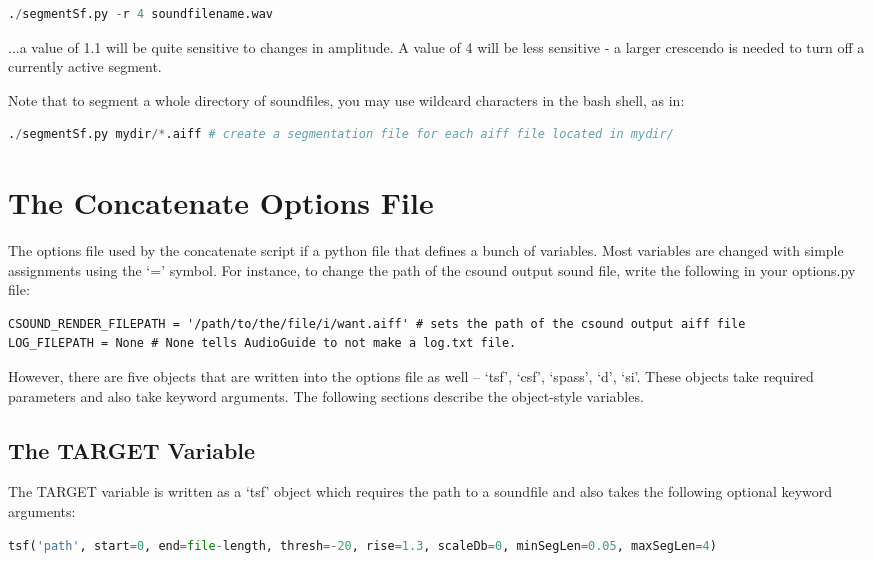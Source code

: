 \documentclass{article}
\begin{document}
\begin{spacing}{1.2}
\begin{lstlisting}[language=python]
./segmentSf.py -r 4 soundfilename.wav
\end{lstlisting}

...a value of 1.1 will be quite sensitive to changes in amplitude.  A value of 4 will be less sensitive - a larger crescendo is needed to turn off a currently active segment.

Note that to segment a whole directory of soundfiles, you may use wildcard characters in the bash shell, as in:
\begin{lstlisting}[language=python]
./segmentSf.py mydir/*.aiff # create a segmentation file for each aiff file located in mydir/
\end{lstlisting}


\section{The Concatenate Options File}
The options file used by the concatenate script if a python file that defines a bunch of variables.  Most variables are changed with simple assignments using the `=' symbol.  For instance, to change the path of the csound output sound file, write the following in your options.py file:
\begin{lstlisting}
CSOUND_RENDER_FILEPATH = '/path/to/the/file/i/want.aiff' # sets the path of the csound output aiff file
LOG_FILEPATH = None # None tells AudioGuide to not make a log.txt file.
\end{lstlisting}


However, there are five objects that are written into the options file as well -- `tsf', `csf', `spass', `d', `si'.  These objects take required parameters and also take keyword arguments.  The following sections describe the object-style variables.

\subsection{The TARGET Variable}\label{target}
The TARGET variable is written as a `tsf' object which requires the path to a soundfile and also takes the following optional keyword arguments:

\begin{lstlisting}[language=python]
tsf('path', start=0, end=file-length, thresh=-20, rise=1.3, scaleDb=0, minSegLen=0.05, maxSegLen=4)
\end{lstlisting}


\end{spacing}
\end{document}
